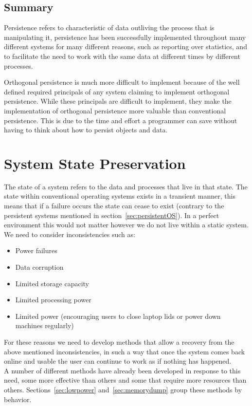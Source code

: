 \documentclass[a4paper,12pt]{article}
\begin{document}
\subsection{Summary}
Persistence refers to characteristic of data outliving the process that is manipulating it, persistence has been successfully implemented throughout many different systems for many different reasons, such as reporting over statistics, and to facilitate the need to work with the same data at different times by different processes. 
\\\par
Orthogonal persistence is much more difficult to implement because of the well defined required principals of any system claiming to implement orthogonal persistence. While these principals are difficult to implement, they make the implementation of orthogonal persistence more valuable than conventional persistence. This is due to the time and effort a programmer can save without having to think about how to persist objects and data. 

\section{System State Preservation}\label{sec:preservation}
The state of a system refers to the data and processes that live in that state. The state within conventional operating systems exists in a transient manner, this means that if a failure occurs the state can cease to exist (contrary to the persistent systems mentioned in section~\ref{sec:persistentOS}). In a perfect environment this would not matter however we do not live within a static system. We need to consider inconsistencies such as:
\begin{itemize}
    \item{Power failures}
    \item{Data corruption}
    \item{Limited storage capacity}
    \item{Limited processing power}
    \item{Limited power (encouraging users to close laptop lids or power down machines regularly)}
\end{itemize}
For these reasons we need to develop methods that allow a recovery from the above mentioned inconsistencies, in such a way that once the system comes back online and usable the user can continue to work as if nothing has happened.
\\A number of different methods have already been developed in response to this need, some more effective than others and some that require more resources than others. Sections~\ref{sec:lowpower} and~\ref{sec:memorydump} group these methods by behavior.
\end{document}
